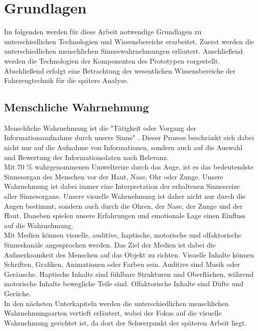 \chapter{Grundlagen}
\label{cha:Grundlagen}
Im folgenden werden für diese Arbeit notwendige Grundlagen zu unterschiedlichen Technologien und Wissensbereiche erarbeitet. Zuerst werden die unterschiedlichen menschlichen Sinneswahrnehmungen erläutert. Anschließend werden die Technologien der Komponenten des Prototypen vorgestellt. Abschließend erfolgt eine Betrachtung der wesentlichen Wissensbereiche der Fahrzeugtechnik für die spätere Analyse.
\section{Menschliche Wahrnehmung}
Menschliche Wahrnehmung ist die "Tätigkeit oder Vorgang der Informationsaufnahme durch unsere Sinne" \cite[Seite 12]{Buhler.2017}. Dieser Prozess beschränkt sich dabei nicht nur auf die Aufnahme von Informationen, sondern auch auf die Auswahl und Bewertung der Informationsdaten nach Relevanz. \cite[Vgl. Seite 12]{Buhler.2017}\\
Mit 70 \% wahrgenommenen Umweltreize durch das Auge, ist es das bedeutendste Sinnesorgan des Menschen vor der Haut, Nase, Ohr oder Zunge. Unsere Wahrnehmung ist dabei immer eine Interpretation der erhaltenen Sinnesreize aller Sinnesorgane. Unsere visuelle Wahrnehmung ist daher nicht nur durch die Augen bestimmt, sondern auch durch die Ohren, der Nase, der Zunge und der Haut. Daneben spielen unsere Erfahrungen und emotionale Lage einen Einfluss auf die Wahrnehmung. \cite[Vgl. Seite 13 f.]{Buhler.2017}\\
Mit Medien können visuelle, auditive, haptische, motorische und olfaktorische Sinneskanäle angesprochen werden. Das Ziel der Medien ist dabei die Aufmerksamkeit des Menschen auf das Objekt zu richten. Visuelle Inhalte können Schriften, Grafiken, Animationen oder Farben sein. Auditive sind Musik oder Geräusche. Haptische Inhalte sind fühlbare Strukturen und Oberflächen, während motorische Inhalte bewegliche Teile sind. Olfaktorische Inhalte sind Düfte und Gerüche. \cite[Vgl. Seite 3]{Buhler.2017}\\
In den nächsten Unterkapiteln werden die unterschiedlichen menschlichen Wahrnehmungsarten vertieft erläutert, wobei der Fokus auf die visuelle Wahrnehmung gerichtet ist, da dort der Schwerpunkt der späteren Arbeit liegt.
